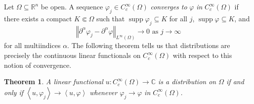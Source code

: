 \documentclass{book}
\newcommand{\bbC}{\mathbb{C}}
\newcommand{\bbR}{\mathbb{R}}
\renewcommand{\phi}{\varphi}
\newcommand{\norm}[1]{\left\Vert {#1} \right\Vert}
\newcommand{\angles}[1]{\left\langle {#1} \right\rangle}
\DeclareMathOperator{\supp}{supp}
\newtheorem{theorem}{Theorem}[chapter]
\theoremstyle{definition}
\theoremstyle{remark}
\numberwithin{equation}{chapter}
\begin{document}
Let $\Omega \subseteq \bbR^n$ be open. A sequence $\phi_j \in C_c^\infty(\Omega)$ \textit{converges to} $\phi$ \textit{in} $C_c^\infty(\Omega)$ if there exists a compact $K \Subset \Omega$ such that $\supp{\phi_j} \subseteq K$ for all $j$, $\supp{\phi} \subseteq K$, and 
\begin{equation}
    \norm{\partial^\alpha \phi_j - \partial^\alpha \phi}_{L^\infty(\Omega)} \rightarrow 0 \text{ as } j \to \infty
\end{equation}    
for all multiindices $\alpha$. The following theorem tells us that distributions are precisely the continuous linear functionals on $C_c^\infty(\Omega)$ with respect to this notion of convergence.
\begin{theorem} \label{thm:continuityAndBoundednessAreEquivalent}
    A linear functional $u \colon C_c^\infty(\Omega) \to \bbC$ is a distribution on $\Omega$ if and only if $\angles{u,\phi_j} \rightarrow \angles{u,\phi}$ whenever $\phi_j \rightarrow \phi$ in $C_c^\infty(\Omega)$.
\end{theorem}
\end{document}
